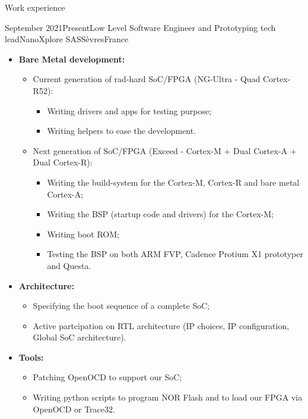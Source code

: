 \documentclass[a4paper, 10pt]{article}
\begin{document}
\begin{section} {Work experience}
    \begin{experience}{September 2021}{Present}{Low Level Software Engineer and Prototyping tech lead}{NanoXplore SAS}{S\`{e}vres}{France}
     \begin{subexperience}
		\begin{itemize}[parsep=0cm,itemsep=0cm,topsep=0cm]
			\item \textbf {Bare Metal development:}
				\begin{itemize}[parsep=0cm,itemsep=0cm,topsep=0cm]
					\item Current generation of rad-hard SoC/FPGA (NG-Ultra - Quad Cortex-R52):
					\begin{itemize}[parsep=0cm,itemsep=0cm,topsep=0cm]
						\item Writing drivers and apps for testing purpose;
						\item Writing helpers to ease the development.
					\end{itemize}
					\item Next generation of SoC/FPGA (Exceed - Cortex-M + Dual Cortex-A + Dual Cortex-R):
					\begin{itemize}[parsep=0cm,itemsep=0cm,topsep=0cm]
						\item Writing the build-system for the Cortex-M, Cortex-R and bare metal Cortex-A;
						\item Writing the BSP (startup code and drivers) for the Cortex-M;
						\item Writing boot ROM;
						\item Testing the BSP on both ARM FVP, Cadence Protium X1 prototyper and Questa.
					\end{itemize}
				\end{itemize}
			\item \textbf {Architecture:}
				\begin{itemize}[parsep=0cm,itemsep=0cm,topsep=0cm]
					\item Specifying the boot sequence of a complete SoC;
					\item Active partcipation on RTL architecture (IP choices, IP configuration, Global SoC architecture).
				\end{itemize}
			\item \textbf {Tools:}
				\begin{itemize}[parsep=0cm,itemsep=0cm,topsep=0cm]
					\item Patching OpenOCD to support our SoC;
					\item Writing python scripts to program NOR Flash and to load our FPGA via OpenOCD or Trace32.

\end{itemize}
\end{itemize}
\end{subexperience}
\end{experience}
\end{section}
\end{document}
